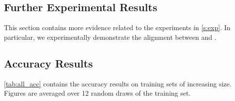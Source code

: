 \subsection{Further Experimental Results}

This section contains more evidence related to the experiments in \autoref{s:exp}.
In particular, we experimentally demonstrate the alignment between \usrule{} and \uslogregp{}.

\iffalse
\subsection{Accuracy Results}
%
\autoref{tab:all_acc} contains the accuracy results on training sets of increasing size. Figures are
averaged over 12 random draws of the training set.

\setlength{\tabcolsep}{3pt}
